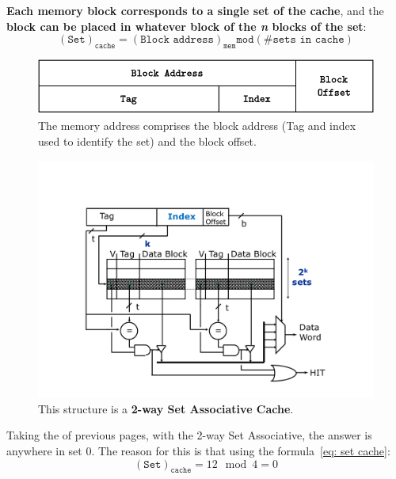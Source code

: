 \highspace
\textbf{Each memory block corresponds to a single set of the cache}, and the \textbf{block can be placed in whatever block of the \emph{n} blocks of the set}:
\begin{equation}\label{eq: set cache}
    \left(\texttt{Set}\right)_{\texttt{cache}} = \left(\texttt{Block address}\right)_{\texttt{mem}} \texttt{mod} \left(\texttt{\# sets in cache}\right)
\end{equation}

\begin{figure}[!htp]
    \centering
    \includegraphics[width=.8\textwidth]{img/direct-mapped-cache-1.pdf}
    \caption{The memory address comprises the block address (Tag and index used to identify the set) and the block offset.}
\end{figure}

\begin{figure}[!htp]
    \centering
    \includegraphics[width=.7\textwidth]{img/n-way-set-associative-cache-1.pdf}
    \caption{This structure is a \textbf{2-way Set Associative Cache}.}
\end{figure}

\newpage

\noindent
Taking the  of previous pages, with the 2-way Set Associative, the answer is anywhere in set $0$. The reason for this is that using the formula~\ref{eq: set cache}:
\begin{equation*}
    \left(\texttt{Set}\right)_{\texttt{cache}} = 12 \mod 4 = 0
\end{equation*}

